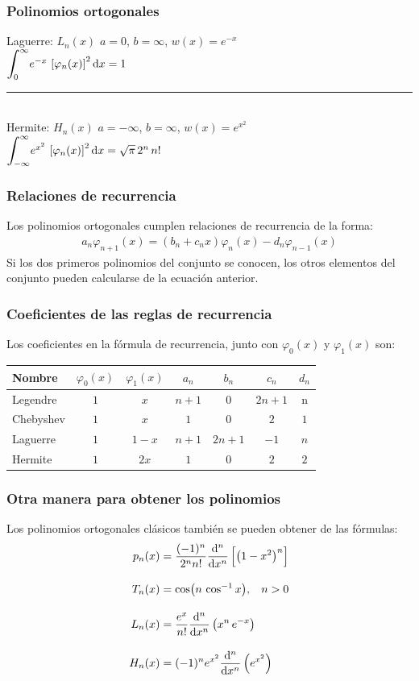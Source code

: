 \documentclass[12pt]{beamer}
\begin{document}
\begin{frame}
\frametitle{Polinomios ortogonales}
Laguerre: $L_{n} (x)$ \hspace{0.5cm} $a = 0$, $b = \infty$, $w (x) = e^{-x}$ \\[0.5em]
$\scaleint{6ex}_{\bs 0}^{\infty} e^{-x} \, \left[ \varphi_{n} (x)\right]^{2} \dd{x} = 1$ 
\\[0.5em]
\rule{10cm}{1pt}
\\[0.5em]
Hermite: $H_{n} (x)$ \hspace{0.5cm} $a = -\infty$, $b = \infty$, $w (x) = e^{x^{2}}$ \\
$\scaleint{6ex}_{\bs -\infty}^{\infty} e^{x^{2}} \, \left[ \varphi_{n} (x) \right]^{2} \dd{x} = \sqrt{\pi} \, 2^{n} \, n!$
\end{frame}
\begin{frame}
\frametitle{Relaciones de recurrencia}
Los polinomios ortogonales cumplen relaciones de recurrencia de la forma:
\begin{align*}
a_{n} \varphi_{n+1} (x) = (b_{n} + c_{n} x) \varphi_{n} (x) - d_{n} \varphi_{n-1} (x) 
\end{align*}
Si los dos primeros polinomios del conjunto se conocen, los otros elementos del conjunto pueden calcularse de la ecuación anterior. 
\end{frame}
\begin{frame}
\frametitle{Coeficientes de las reglas de recurrencia}
Los coeficientes en la fórmula de recurrencia, junto con $\varphi_{0} (x)$ y $\varphi_{1} (x)$ son:
\pause
\begin{table}
\centering
\fontsize{12}{12}\selectfont
\begin{tabular}{| l | c | c | c | c | c | c |}
\hline
Nombre & $\varphi_{0}(x)$ & $\varphi_{1}(x)$ & $a_{n}$ & $b_{n}$ & $c_{n}$ & $d_{n}$ \\ \hline
Legendre & $1$ & $x$ & $n+1$ & $0$ & $2n+1$ & n \\
Chebyshev & $1$ & $x$ & $1$ & $0$ & $2$ & $1$ \\
Laguerre & $1$ & $1-x$ & $n+1$ & $2n+1$ & $-1$ & $n$ \\
Hermite & $1$ & $2x$ & $1$ & $0$ & $2$ & $2$ \\ \hline
\end{tabular}
\end{table}
\end{frame}
\begin{frame}
\frametitle{Otra manera para obtener los polinomios}
Los polinomios ortogonales clásicos también se pueden obtener de las fórmulas:
\pause
\begin{align*}
p_{n} (x) &= \dfrac{(-1)^{n}}{2^{n}n!} \dv[n]{x} \left[ \left( 1 - x^{2} \right)^{n} \right] \\[1em]
T_{n} (x) &= \cos(n \, \cos^{-1} x), \hspace{0.3cm} n > 0 \\[1em]
L_{n} (x) &= \dfrac{e^{x}}{n!} \dv[n]{x} \left( x^{n} \, e^{-x} \right) \\[1em]
H_{n} (x) &= (-1)^{n} e^{x^{2}} \dv[n]{x} \left(e^{x^{2}} \right)
\end{align*}
\end{frame}
\end{document}

